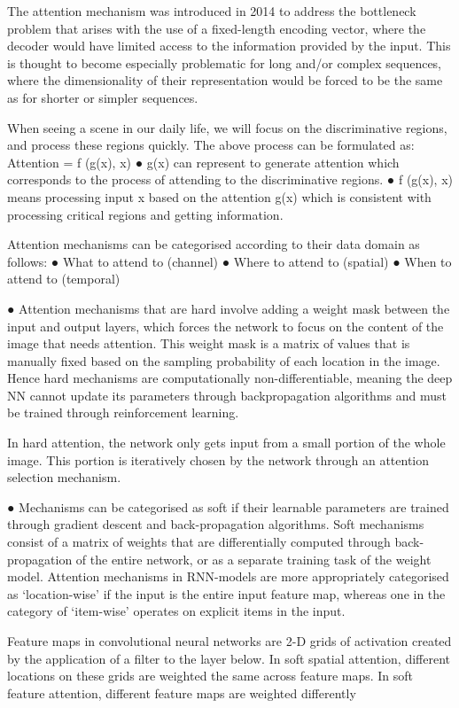 The attention mechanism was introduced in 2014 to address the bottleneck
problem that arises with the use of a fixed-length encoding vector, where the
decoder would have limited access to the information provided by the input.
This is thought to become especially problematic for long and/or complex
sequences, where the dimensionality of their representation would be forced to
be the same as for shorter or simpler sequences.

When seeing a scene in our daily life, we will focus on the discriminative
regions, and process these regions quickly.
The above process can be formulated as:
Attention = f (g(x), x)
● g(x) can represent to generate attention which corresponds to the
process of attending to the discriminative regions.
● f (g(x), x) means processing input x based on the attention g(x) which
is consistent with processing critical regions and getting information.

Attention mechanisms can be categorised according to their data domain as
follows:
● What to attend to (channel)
● Where to attend to (spatial)
● When to attend to (temporal)

● Attention mechanisms that are hard involve adding a weight mask
between the input and output layers, which forces the network to focus on
the content of the image that needs attention.
This weight mask is a matrix of values that is manually fixed based on the
sampling probability of each location in the image.
Hence hard mechanisms are computationally non-differentiable, meaning
the deep NN cannot update its parameters through backpropagation
algorithms and must be trained through reinforcement learning.

In hard attention, the network only
gets input from a small portion of the
whole image. This portion is iteratively
chosen by the network through an
attention selection mechanism.

● Mechanisms can be categorised as soft if their learnable parameters are
trained through gradient descent and back-propagation algorithms.
Soft mechanisms consist of a matrix of weights that are differentially
computed through back-propagation of the entire network, or as a
separate training task of the weight model.
Attention mechanisms in RNN-models are more appropriately categorised
as ‘location-wise’ if the input is the entire input feature map, whereas one
in the category of ‘item-wise’ operates on explicit items in the input.

Feature maps in convolutional neural
networks are 2-D grids of activation
created by the application of a filter to
the layer below. In soft spatial
attention, different locations on these
grids are weighted the same across
feature maps.
In soft feature attention, different
feature maps are weighted differently

